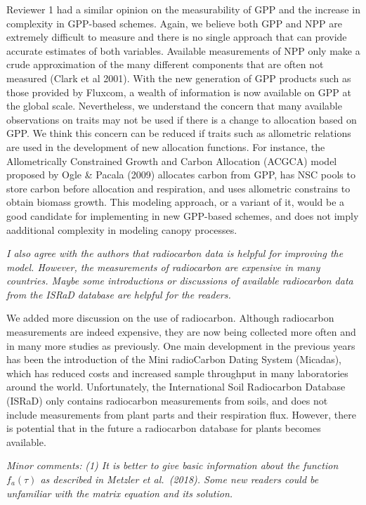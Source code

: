 Reviewer 1 had a similar opinion on the measurability of GPP and the
increase in complexity in GPP-based schemes. Again, we believe both GPP
and NPP are extremely difficult to measure and there is no single
approach that can provide accurate estimates of both variables.
Available measurements of NPP only make a crude approximation of the
many different components that are often not measured (Clark et al
2001). With the new generation of GPP products such as those provided by
Fluxcom, a wealth of information is now available on GPP at the global
scale. Nevertheless, we understand the concern that many available
observations on traits may not be used if there is a change to
allocation based on GPP. We think this concern can be reduced if traits
such as allometric relations are used in the development of new
allocation functions. For instance, the Allometrically Constrained
Growth and Carbon Allocation (ACGCA) model proposed by Ogle \& Pacala
(2009) allocates carbon from GPP, has NSC pools to store carbon before
allocation and respiration, and uses allometric constrains to obtain
biomass growth. This modeling approach, or a variant of it, would be a
good candidate for implementing in new GPP-based schemes, and does not
imply aadditional complexity in modeling canopy processes.

\emph{I also agree with the authors that radiocarbon data is helpful for
improving the model. However, the measurements of radiocarbon are
expensive in many countries. Maybe some introductions or discussions of
available radiocarbon data from the ISRaD database are helpful for the
readers.}

We added more discussion on the use of radiocarbon. Although radiocarbon
measurements are indeed expensive, they are now being collected more
often and in many more studies as previously. One main development in
the previous years has been the introduction of the Mini radioCarbon
Dating System (Micadas), which has reduced costs and increased sample
throughput in many laboratories around the world. Unfortunately, the
International Soil Radiocarbon Database (ISRaD) only contains
radiocarbon measurements from soils, and does not include measurements
from plant parts and their respiration flux. However, there is potential
that in the future a radiocarbon database for plants becomes available.

\emph{Minor comments:} \emph{(1) It is better to give basic information
about the function $f_a(\tau)$ as described in Metzler et al.~(2018). Some
new readers could be unfamiliar with the matrix equation and its
solution.}

